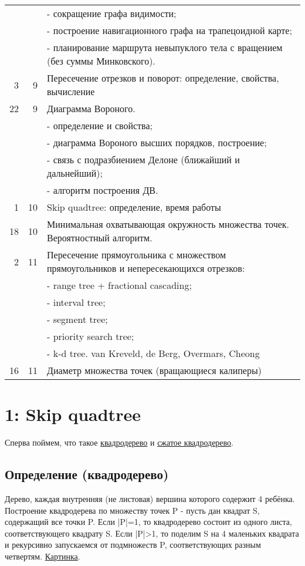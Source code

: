 \documentclass[11pt]{article}
\begin{document}
\begin{center}
\begin{tabular}{rrl}
 &  & - сокращение графа видимости;\\
 &  & - построение навигационного графа на трапецоидной карте;\\
 &  & - планирование маршрута невыпуклого тела с вращением (без суммы Минковского).\\
3 & 9 & Пересечение отрезков и поворот: определение, свойства, вычисление\\
22 & 9 & Диаграмма Вороного.\\
 &  & - определение и свойства;\\
 &  & - диаграмма Вороного высших порядков, построение;\\
 &  & - связь с подразбиением Делоне (ближайший и дальнейший);\\
 &  & - алгоритм построения ДВ.\\
1 & 10 & Skip quadtree: определение, время работы\\
18 & 10 & Минимальная охватывающая окружность множества точек. Вероятностный алгоритм.\\
2 & 11 & Пересечение прямоугольника с множеством прямоугольников и непересекающихся отрезков:\\
 &  & - range tree + fractional cascading;\\
 &  & - interval tree;\\
 &  & - segment tree;\\
 &  & - priority search tree;\\
 &  & - k-d tree.        van Kreveld, de Berg, Overmars, Cheong\\
16 & 11 & Диаметр множества точек (вращающиеся калиперы)\\
\hline
\end{tabular}
\end{center}
\section{{\bfseries{}} 1:  Skip quadtree}
\label{sec:orgheadline16}
Сперва поймем, что такое \href{http://neerc.ifmo.ru/wiki/index.php?title=Квадродеревья}{квадродерево} и \href{http://neerc.ifmo.ru/wiki/index.php?title=Квадродеревья#.D0.A1.D0.B6.D0.B0.D1.82.D0.BE.D0.B5_.D0.BA.D0.B2.D0.B0.D0.B4.D1.80.D0.BE.D0.B4.D0.B5.D1.80.D0.B5.D0.B2.D0.BE}{сжатое квадродерево}.
\subsection{Определение (квадродерево)}
\label{sec:orgheadline3}
Дерево, каждая внутренняя (не листовая) вершина которого содержит 4
ребёнка.
Построение квадродерева по множеству точек P - пусть дан квадрат S,
содержащий все точки P. Если |P|=1, то квадродерево состоит из
одного листа, соответствующего квадрату S. Если |P|>1, то поделим S
на 4 маленьких квадрата и рекурсивно запускаемся от подмножеств P,
соответствующих разным четвертям. \href{http://neerc.ifmo.ru/wiki/images/a/a7/Quadtree.png}{Картинка}.
\end{document}

